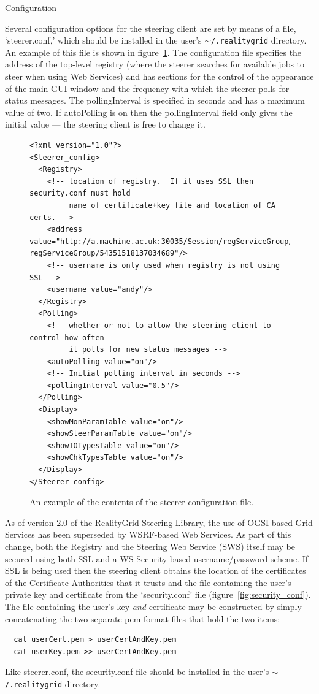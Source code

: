 \documentclass[a4paper,twoside]{article}
\begin{document}
\begin{section}{Configuration}
\label{sec:config}

Several configuration options for the steering client are set by means
of a file, `steerer.conf,' which should be installed in the user's
\texttt{$\sim$/.realitygrid} directory. An example of this file is
shown in figure~\ref{fig:steerer_conf}.  The configuration file
specifies the address of the top-level registry (where the steerer
searches for available jobs to steer when using Web Services) and has
sections for the control of the appearance of the main GUI window and
the frequency with which the steerer polls for status messages.  The
pollingInterval is specified in seconds and has a maximum value of
two. If autoPolling is on then the pollingInterval field only gives
the initial value --- the steering client is free to change it.

\begin{figure}
\begin{verbatim}<?xml version="1.0"?>
<Steerer_config>
  <Registry>
    <!-- location of registry.  If it uses SSL then security.conf must hold
         name of certificate+key file and location of CA certs. -->
    <address value="http://a.machine.ac.uk:30035/Session/regServiceGroup/
regServiceGroup/54351518137034689"/>
    <!-- username is only used when registry is not using SSL -->
    <username value="andy"/>
  </Registry>
  <Polling>
    <!-- whether or not to allow the steering client to control how often
         it polls for new status messages -->
    <autoPolling value="on"/>
    <!-- Initial polling interval in seconds -->
    <pollingInterval value="0.5"/>
  </Polling>
  <Display>
    <showMonParamTable value="on"/>
    <showSteerParamTable value="on"/>
    <showIOTypesTable value="on"/>
    <showChkTypesTable value="on"/>
  </Display>
</Steerer_config>
\end{verbatim}
\caption{An example of the contents of the steerer configuration file.}
\label{fig:steerer_conf}
\end{figure}

As of version 2.0 of the RealityGrid Steering Library, the use of
OGSI-based Grid Services has been superseded by WSRF-based Web
Services.  As part of this change, both the Registry and the Steering
Web Service (SWS) itself may be secured using both SSL and a
WS-Security-based username/password scheme. If SSL is being used then
the steering client obtains the location of the certificates of the
Certificate Authorities that it trusts and the file containing the
user's private key and certificate from the `security.conf' file
(figure~\ref{fig:security_conf}). The file containing the user's key
{\em and} certificate may be constructed by simply concatenating the
two separate pem-format files that hold the two items:
\begin{verbatim}
  cat userCert.pem > userCertAndKey.pem
  cat userKey.pem >> userCertAndKey.pem
\end{verbatim}
Like steerer.conf, the security.conf file should be installed in the user's
\texttt{$\sim$/.realitygrid} directory.


\end{section}
\end{document}
